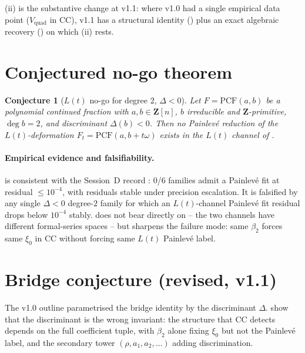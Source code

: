 \documentclass[11pt,reqno]{amsart}
\theoremstyle{plain}
\newtheorem{conjecture}[theorem]{Conjecture}
\theoremstyle{definition}
\theoremstyle{remark}
\newcommand{\PCF}{\mathrm{PCF}}
\newcommand{\Lt}{L(t)}
\newcommand{\CC}{\mathrm{CC}}
\newcommand{\Vquad}{V_{\mathrm{quad}}}
\begin{document}
(ii) is the substantive change at v1.1: where
v1.0 had a single empirical data point ($\Vquad$ in $\CC$),
v1.1 has a structural identity () plus an
exact algebraic recovery () on which
(ii) rests.

\section{Conjectured no-go theorem}
\label{sec:nogo}

\begin{conjecture}[$\Lt$ no-go for degree $2$, $\Delta<0$]
\label{conj:nogo}
Let $F = \PCF(a, b)$ be a polynomial continued fraction with
$a, b \in \mathbf{Z}[n]$, $b$ irreducible and
$\mathbf{Z}$-primitive, $\deg b = 2$, and discriminant
$\Delta(b) < 0$. Then no Painlev\'e reduction of the
$\Lt$-deformation $F_t = \PCF(a, b + t\omega)$ exists in the
$\Lt$ channel of .
\end{conjecture}

\paragraph{Empirical evidence and falsifiability.}
 is consistent with the Session~D record
\cite{siarc_painleve_deep_6x}: 0/6 families admit a Painlev\'e
fit at residual $\le 10^{-4}$, with residuals stable under
precision escalation. It is falsified by any single
$\Delta < 0$ degree-$2$ family for which an $\Lt$-channel
Painlev\'e fit residual drops below $10^{-4}$ stably.
 does not bear directly on  --
the two channels have different formal-series spaces -- but
 sharpens the failure mode: same $\beta_2$
forces same $\xi_0$ in $\CC$ without forcing same $\Lt$
Painlev\'e label.

\section{Bridge conjecture (revised, v1.1)}
\label{sec:bridge}

The v1.0 outline parametrised the bridge identity by the
discriminant $\Delta$.  show
that the discriminant is the wrong invariant: the structure
that $\CC$ detects depends on the full coefficient tuple, with
$\beta_2$ alone fixing $\xi_0$ but not the Painlev\'e label,
and the secondary tower $(\rho, a_1, a_2, \ldots)$ adding
discrimination.
\end{document}
